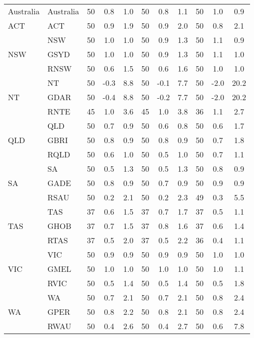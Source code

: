\begin{table}[!ht]
{\begin{tabular}{llccccccccc}
    
      Australia & Australia & 50    & 0.8 & 1.0 & 50    & 0.8 & 1.1 & 50    & 1.0 & 0.9 \\
    ACT   & ACT   & 50    & 0.9 & 1.9 & 50    & 0.9 & 2.0 & 50    & 0.8 & 2.1 \\
    \multirow{3}[0]{*}{NSW} & NSW   & 50    & 1.0 & 1.0 & 50    & 0.9 & 1.3 & 50    & 1.1 & 0.9 \\
          & GSYD  & 50    & 1.0 & 1.0 & 50    & 0.9 & 1.3 & 50    & 1.1 & 1.0 \\
          & RNSW  & 50    & 0.6 & 1.5 & 50    & 0.6 & 1.6 & 50    & 1.0 & 1.0 \\
    \multirow{3}[0]{*}{NT} & NT    & 50    & -0.3 & 8.8 & 50    & -0.1 & 7.7 & 50    & -2.0 & 20.2 \\
          & GDAR  & 50    & -0.4 & 8.8 & 50    & -0.2 & 7.7 & 50    & -2.0 & 20.2 \\
          & RNTE  & 45    & 1.0 & 3.6 & 45    & 1.0 & 3.8 & 36    & 1.1 & 2.7 \\
    \multirow{3}[0]{*}{QLD} & QLD   & 50    & 0.7 & 0.9 & 50    & 0.6 & 0.8 & 50    & 0.6 & 1.7 \\
          & GBRI  & 50    & 0.8 & 0.9 & 50    & 0.8 & 0.9 & 50    & 0.7 & 1.8 \\
          & RQLD  & 50    & 0.6 & 1.0 & 50    & 0.5 & 1.0 & 50    & 0.7 & 1.1 \\
    \multirow{3}[0]{*}{SA} & SA    & 50    & 0.5 & 1.3 & 50    & 0.5 & 1.3 & 50    & 0.8 & 0.9 \\
          & GADE  & 50    & 0.8 & 0.9 & 50    & 0.7 & 0.9 & 50    & 0.9 & 0.9 \\
          & RSAU  & 50    & 0.2 & 2.1 & 50    & 0.2 & 2.3 & 49    & 0.3 & 5.5 \\
    \multirow{3}[0]{*}{TAS} & TAS   & 37    & 0.6 & 1.5 & 37    & 0.7 & 1.7 & 37    & 0.5 & 1.1 \\
          & GHOB  & 37    & 0.7 & 1.5 & 37    & 0.8 & 1.6 & 37    & 0.6 & 1.4 \\
          & RTAS  & 37    & 0.5 & 2.0 & 37    & 0.5 & 2.2 & 36    & 0.4 & 1.1 \\
    \multirow{3}[0]{*}{VIC} & VIC   & 50    & 0.9 & 0.9 & 50    & 0.9 & 0.9 & 50    & 1.0 & 1.0 \\
          & GMEL  & 50    & 1.0 & 1.0 & 50    & 1.0 & 1.0 & 50    & 1.0 & 1.1 \\
          & RVIC  & 50    & 0.5 & 1.4 & 50    & 0.5 & 1.4 & 50    & 0.5 & 1.8 \\
    \multirow{3}[1]{*}{WA} & WA    & 50    & 0.7 & 2.1 & 50    & 0.7 & 2.1 & 50    & 0.8 & 2.4 \\
          & GPER  & 50    & 0.8 & 2.2 & 50    & 0.8 & 2.1 & 50    & 0.8 & 2.4 \\
          & RWAU  & 50    & 0.4 & 2.6 & 50    & 0.4 & 2.7 & 50    & 0.6 & 7.8 \\

 
    
    \bottomrule
    \end{tabular}%
 
  }
  
  
  
\end{table}%
